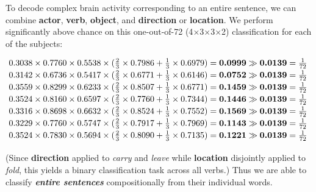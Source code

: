 To decode complex brain activity corresponding to an entire sentence, we can
combine \textbf{actor}, \textbf{verb}, \textbf{object}, and \textbf{direction}
or \textbf{location}.
%
We perform significantly above chance on this one-out-of-72
(4$\times$3$\times$3$\times$2) classification for each of the subjects:
%
\begin{small}
  \begin{equation*}
      \arraycolsep=2pt
    \begin{array}{@{}lclclclclclclclcc@{}}
\text{0.3038}\times\text{0.7760}\times\text{0.5538}\times(\frac{\text{2}}{\text{3}}\times\text{0.7986}+\frac{\text{1}}{\text{3}}\times\text{0.6979})=\textbf{0.0999}\gg\textbf{0.0139}=\frac{\text{1}}{\text{72}}\\[0.5ex]
\text{0.3142}\times\text{0.6736}\times\text{0.5417}\times(\frac{\text{2}}{\text{3}}\times\text{0.6771}+\frac{\text{1}}{\text{3}}\times\text{0.6146})=\textbf{0.0752}\gg\textbf{0.0139}=\frac{\text{1}}{\text{72}}\\[0.5ex]
\text{0.3559}\times\text{0.8299}\times\text{0.6233}\times(\frac{\text{2}}{\text{3}}\times\text{0.8507}+\frac{\text{1}}{\text{3}}\times\text{0.6771})=\textbf{0.1459}\gg\textbf{0.0139}=\frac{\text{1}}{\text{72}}\\[0.5ex]
\text{0.3524}\times\text{0.8160}\times\text{0.6597}\times(\frac{\text{2}}{\text{3}}\times\text{0.7760}+\frac{\text{1}}{\text{3}}\times\text{0.7344})=\textbf{0.1446}\gg\textbf{0.0139}=\frac{\text{1}}{\text{72}}\\[0.5ex]
\text{0.3316}\times\text{0.8698}\times\text{0.6632}\times(\frac{\text{2}}{\text{3}}\times\text{0.8524}+\frac{\text{1}}{\text{3}}\times\text{0.7552})=\textbf{0.1569}\gg\textbf{0.0139}=\frac{\text{1}}{\text{72}}\\[0.5ex]
\text{0.3229}\times\text{0.7760}\times\text{0.5747}\times(\frac{\text{2}}{\text{3}}\times\text{0.7917}+\frac{\text{1}}{\text{3}}\times\text{0.7969})=\textbf{0.1143}\gg\textbf{0.0139}=\frac{\text{1}}{\text{72}}\\[0.5ex]
\text{0.3524}\times\text{0.7830}\times\text{0.5694}\times(\frac{\text{2}}{\text{3}}\times\text{0.8090}+\frac{\text{1}}{\text{3}}\times\text{0.7135})=\textbf{0.1221}\gg\textbf{0.0139}=\frac{\text{1}}{\text{72}}\\[0.5ex]
    \end{array}
  \end{equation*}
\end{small}
%
(Since \textbf{direction} applied to \emph{carry} and \emph{leave} while
\textbf{location} disjointly applied to \emph{fold}, this yields a binary
classification task across all verbs.)
%
Thus we are able to classify \textbf{\emph{entire sentences}} compositionally
from their individual words.

